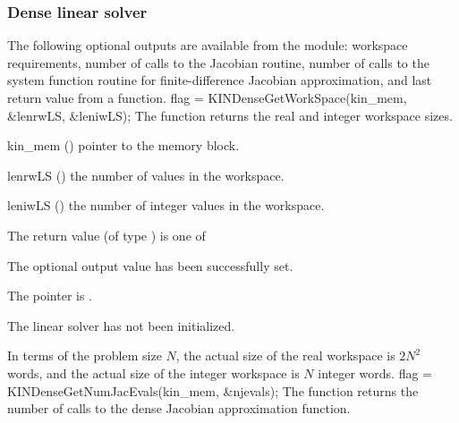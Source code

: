 
\subsubsection{Dense linear solver}\label{sss:optout_dense}
The following optional outputs are available from the {\kindense} module:
workspace requirements, number of calls to the Jacobian routine, number of 
calls to the system function routine for finite-difference Jacobian approximation,
and last return value from a {\kindense} function.
{
  flag = KINDenseGetWorkSpace(kin\_mem, \&lenrwLS, \&leniwLS);
}
{
  The function  returns the
  {\kindense} real and integer workspace sizes.
}
{
  \begin{args}
  \item[kin\_mem] ()
    pointer to the {\kinsol} memory block.
  \item[lenrwLS] ()
    the number of  values in the {\kindense} workspace.
  \item[leniwLS] ()
    the number of integer values in the {\kindense} workspace.
  \end{args}
}
{
  The return value  (of type ) is one of
  \begin{args}
  \item[\Id{KINDENSE\_SUCCESS}] 
    The optional output value has been successfully set.
  \item[\Id{KINDENSE\_MEM\_NULL}]
    The  pointer is .
  \item[\Id{KINDENSE\_LMEM\_NULL}]
    The {\kindense} linear solver has not been initialized.
  \end{args}
}
{
  In terms of the problem size $N$, the actual size of the real workspace
  is $2N^2$  words, and the actual size of the integer workspace
  is $N$ integer words.
}
{
  flag = KINDenseGetNumJacEvals(kin\_mem, \&njevals);
}
{
  The function  returns the
  number of calls to the dense Jacobian approximation function.
}
